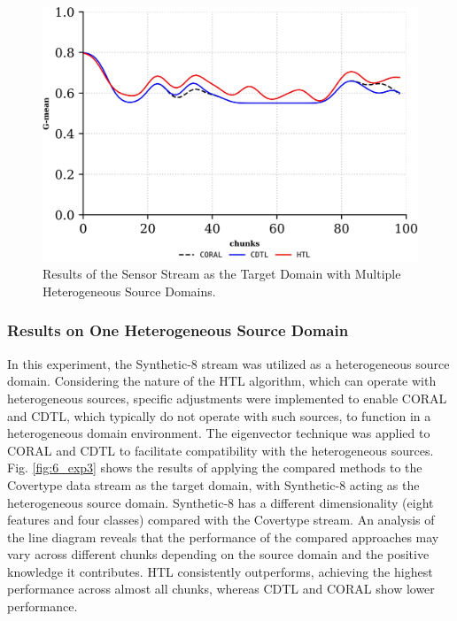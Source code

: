 \begin{figure}[!ht]
	\centering
	\includegraphics[width=1\linewidth]{6_transfer_learning/figures/exp3.png}
  \caption{Results of the Sensor Stream as the Target Domain with Multiple Heterogeneous Source Domains.}

	\label{fig:6_exp5}
\end{figure}

\subsubsection{Results on One Heterogeneous Source Domain}
In this experiment, the Synthetic-8 stream was utilized as a heterogeneous source domain. Considering the nature of the HTL algorithm, which can operate with heterogeneous sources, specific adjustments were implemented to enable CORAL and CDTL, which typically do not operate with such sources, to function in a heterogeneous domain environment. The eigenvector technique was applied to CORAL and CDTL to facilitate compatibility with the heterogeneous sources. Fig. \ref{fig:6_exp3} shows the results of applying the compared methods to the Covertype data stream as the target domain, with Synthetic-8 acting as the heterogeneous source domain. Synthetic-8 has a different dimensionality (eight features and four classes) compared with the Covertype stream. An analysis of the line diagram reveals that the performance of the compared approaches may vary across different chunks depending on the source domain and the positive knowledge it contributes. HTL consistently outperforms, achieving the highest performance across almost all chunks, whereas CDTL and CORAL show lower performance.

